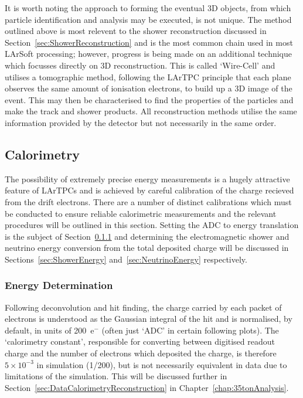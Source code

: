 It is worth noting the approach to forming the eventual 3D objects, from which particle identification and analysis may be executed, is not unique.  The method outlined above is most relevent to the shower reconstruction discussed in Section~\ref{sec:ShowerReconstruction} and is the most common chain used in most LArSoft processing; however, progress is being made on an additional technique which focusses directly on 3D reconstruction.  This is called `Wire-Cell' \cite{WireCellWebsite} and utilises a tomographic method, following the LArTPC principle that each plane observes the same amount of ionisation electrons, to build up a 3D image of the event.  This may then be characterised to find the properties of the particles and make the track and shower products.  All reconstruction methods utilise the same information provided by the detector but not necessarily in the same order.

\subsection{Calorimetry}\label{sec:Calorimetry}

The possibility of extremely precise energy measurements is a hugely attractive feature of LArTPCs and is achieved by careful calibration of the charge recieved from the drift electrons.  There are a number of distinct calibrations which must be conducted to ensure reliable calorimetric measurements and the relevant procedures will be outlined in this section.  Setting the ADC to energy translation is the subject of Section~\ref{sec:EnergyDetermination} and determining the electromagnetic shower and neutrino energy conversion from the total deposited charge will be discussed in Sections~\ref{sec:ShowerEnergy} and~\ref{sec:NeutrinoEnergy} respectively.

\subsubsection{Energy Determination}\label{sec:EnergyDetermination}

Following deconvolution and hit finding, the charge carried by each packet of electrons is understood as the Gaussian integral of the hit and is normalised, by default, in units of 200~e$^-$ (often just `ADC' in certain following plots).  The `calorimetry constant', responsible for converting between digitised readout charge and the number of electrons which deposited the charge, is therefore $5\times10^{-3}$ in simulation (1/200), but is not necessarily equivalent in data due to limitations of the simulation.  This will be discussed further in Section~\ref{sec:DataCalorimetryReconstruction} in Chapter~\ref{chap:35tonAnalysis}.

